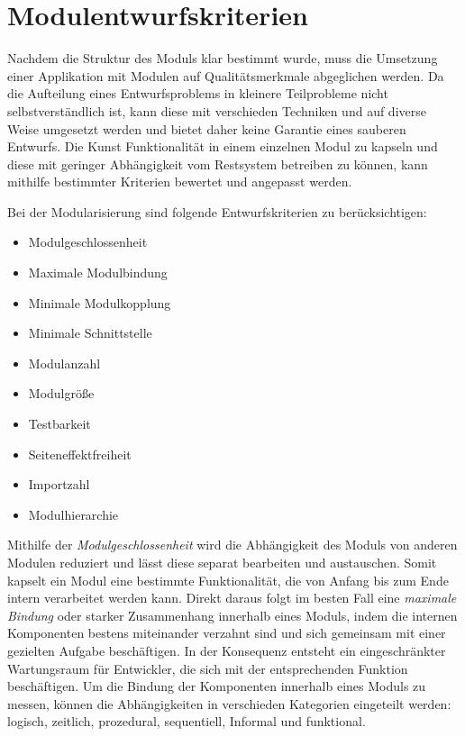   \section{Modulentwurfskriterien} \label{sec:MEK}
    Nachdem die Struktur des Moduls klar bestimmt wurde, muss die Umsetzung einer Applikation mit Modulen auf Qualitätsmerkmale abgeglichen werden. Da die Aufteilung eines Entwurfsproblems in kleinere Teilprobleme nicht selbstverständlich ist, kann diese mit verschieden Techniken und auf diverse Weise umgesetzt werden und bietet daher keine Garantie eines sauberen Entwurfs. Die Kunst Funktionalität in einem einzelnen Modul zu kapseln und diese mit geringer Abhängigkeit vom Restsystem betreiben zu können, kann mithilfe bestimmter Kriterien bewertet und angepasst werden. \cite{softModDes,softMdDes2,modulMitJava9,java9modRevealed,modulProgJava9}\bigbreak
    
    Bei der Modularisierung sind folgende Entwurfskriterien zu berücksichtigen: 
    \begin{itemize}
      \item Modulgeschlossenheit 
      \item Maximale Modulbindung 
      \item Minimale Modulkopplung 
      \item Minimale Schnittstelle 
      \item Modulanzahl 
      \item Modulgröße 
      \item Testbarkeit 
      \item Seiteneffektfreiheit 
      \item Importzahl 
      \item Modulhierarchie 
    \end{itemize}
    Mithilfe der \textit{Modulgeschlossenheit} wird die Abhängigkeit des Moduls von anderen Modulen reduziert und lässt diese separat bearbeiten und austauschen. Somit kapselt ein Modul eine bestimmte Funktionalität, die von Anfang bis zum Ende intern verarbeitet werden kann. Direkt daraus folgt im besten Fall eine \textit{maximale Bindung} oder starker Zusammenhang innerhalb eines Moduls, indem die internen Komponenten bestens miteinander verzahnt sind und sich gemeinsam mit einer gezielten Aufgabe beschäftigen. In der Konsequenz entsteht ein eingeschränkter Wartungsraum für Entwickler, die sich mit der entsprechenden Funktion beschäftigen. Um die Bindung der Komponenten innerhalb eines Moduls zu messen, können die Abhängigkeiten in verschieden Kategorien eingeteilt werden: logisch, zeitlich, prozedural, sequentiell, Informal und funktional.


